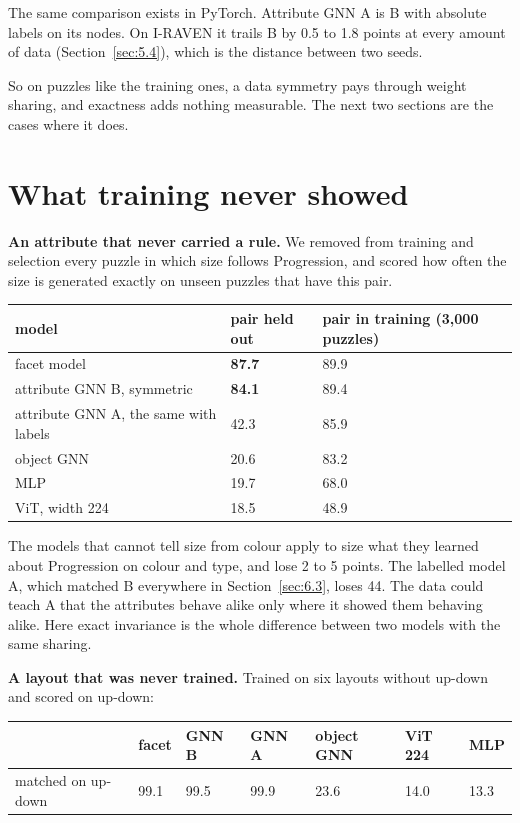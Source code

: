 The same comparison exists in PyTorch. Attribute GNN A is B with absolute labels on its nodes. On I-RAVEN it trails B by 0.5 to 1.8 points at every amount of data (Section~\ref{sec:5.4}), which is the distance between two seeds.

So on puzzles like the training ones, a data symmetry pays through weight sharing, and exactness adds nothing measurable. The next two sections are the cases where it does.

\section{What training never showed}\label{sec:6.4}

\textbf{An attribute that never carried a rule.} We removed from training and selection every puzzle in which size follows Progression, and scored how often the size is generated exactly on unseen puzzles that have this pair.

\begin{center}\small
\begin{tabularx}{\linewidth}{@{}YlY@{}}
\toprule
model & pair held out & pair in training (3,000 puzzles) \\
\midrule
facet model & \textbf{87.7} & 89.9 \\
attribute GNN B, symmetric & \textbf{84.1} & 89.4 \\
attribute GNN A, the same with labels & 42.3 & 85.9 \\
object GNN & 20.6 & 83.2 \\
MLP & 19.7 & 68.0 \\
ViT, width 224 & 18.5 & 48.9 \\
\bottomrule
\end{tabularx}
\end{center}

The models that cannot tell size from colour apply to size what they learned about Progression on colour and type, and lose 2 to 5 points. The labelled model A, which matched B everywhere in Section~\ref{sec:6.3}, loses 44. The data could teach A that the attributes behave alike only where it showed them behaving alike. Here exact invariance is the whole difference between two models with the same sharing.

\textbf{A layout that was never trained.} Trained on six layouts without up-down and scored on up-down:

\begin{center}\small
\begin{tabular}{@{}lllllll@{}}
\toprule
 & facet & GNN B & GNN A & object GNN & ViT 224 & MLP \\
\midrule
matched on up-down & 99.1 & 99.5 & 99.9 & 23.6 & 14.0 & 13.3 \\
\bottomrule
\end{tabular}
\end{center}

